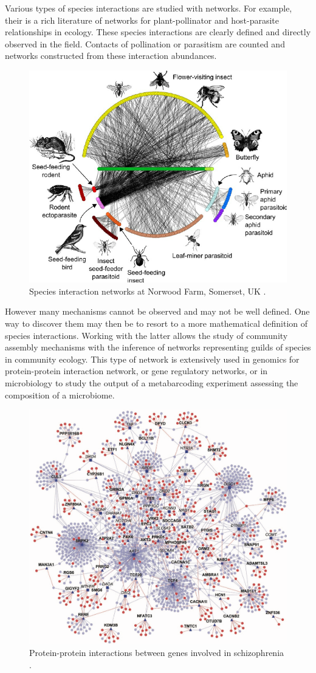 Various types of species interactions are studied with networks. For example, their is a rich literature of networks for plant-pollinator and host-parasite relationships in ecology. These species interactions are clearly defined and directly observed in the field. Contacts of pollination or parasitism are counted and networks constructed from these interaction abundances.
\begin{figure}
\centering
\includegraphics[width=0.7\linewidth]{figs/pocock.png}
\caption{Species interaction networks at Norwood Farm, Somerset, UK \citep{PED12,BRM13}.}
\label{pocock}
\end{figure}
 However many mechanisms cannot be observed and may not be well defined. One way to discover them may then be to resort to a more mathematical definition of species interactions. Working with the latter allows the study of community assembly mechanisms with the inference of networks representing guilds of species in community ecology. This type of network is extensively used in genomics for protein-protein interaction network, or gene regulatory networks, or in microbiology to study the output of a metabarcoding experiment assessing the composition of a microbiome. 
 
 \begin{figure}
\centering
\includegraphics[width=0.7\linewidth]{figs/PPInetwork.png}
\caption{Protein-protein interactions between genes involved in schizophrenia \citep{GTH16}.}
\label{PPI}
\end{figure}

